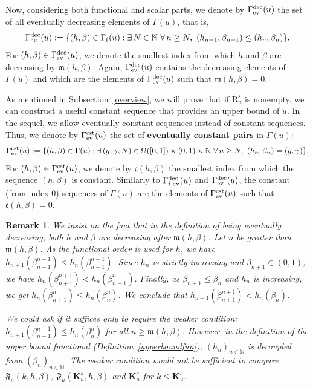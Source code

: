 \documentclass{article}
\def\funset{\Gamma}
\def\fmong{\funset_{{\rm ev}}^{\rm dec}}
\def\fmonfung{{\funset}_{\rm f,{\rm ev}}^{\rm dec}}
\def\fset{\Omega([0,1])}
\def\fcste{\funset_{{\rm ev}}^{\rm cst}}
\def\mon{\mathfrak{m}}
\def\cst{\mathfrak{c}}
\def\secfunh{\funset_{\rm f}}
\def\Fu{\mathfrak{F}_u}
\def\nn{\mathbb N}
\def\bigks{\mathbf{K}^s}
\def\gls#1{{\mathrm R}_{#1}}
\def\gsls#1{\gls{#1}^s}
\newtheorem{remark}{Remark}
\def\blue#1{#1}
\begin{document}
	\blue{Now, considering both functional and scalar parts, we denote by $\fmong(u)$ the set of} all eventually decreasing elements of $\funset(u)$, that is,
	\[
	\fmong(u):=\{(h,\beta)\in\secfunh(u): \exists\, N\in \nn\ \forall\, n\geq N,\ (h_{n+1},\beta_{n+1})\leq (h_n,\beta_n)\}.
	\]
	For $(h,\beta)\in \fmong(u)$, we denote the smallest index from which $h$ and $\beta$ are decreasing by $\mon(h,\beta)$. \blue{Again, $\fmong(u)$ contains the decreasing elements of $\funset(u)$ and which are the elements of $\fmong(u)$ such that $\mon(h,\beta)=0$.}
	
\blue{As mentioned in Subsection~\ref{overview}, we will prove that if $\gsls{u}$ is nonempty, we can construct a useful constant sequence that provides an upper bound of $u$. In the sequel, we allow eventually constant sequences instead of constant sequences. Thus, we denote by $\fcste(u)$ the set of {\bf eventually constant pairs} in $\funset(u)$}:
\[
\fcste(u):=\{(h,\beta)\in \funset(u) : \exists\, (g,\gamma,N)\in\fset\times (0,1) \times\nn\ \forall\, n\geq N,\  (h_n,\beta_n)=(g,\gamma)\}.
\]
For $(h,\beta)\in\fcste(u)$, we denote by $\cst(h,\beta)$ the smallest index from which the sequence $(h,\beta)$ is constant. \blue{Similarly to $\fmonfung(u)$ and $\fmong(u)$, the constant (from index 0) sequences of $\funset(u)$ are the elements of $\fcste(u)$ such that $\cst(h,\beta)=0$.}

	\begin{remark}
		We insist on the fact that in the definition of being eventually decreasing, both $h$ and $\beta$ are decreasing after $\mon(h,\beta)$. Let $n$ be greater than $\mon(h,\beta)$. As the functional order is used for $h$, we have $h_{n+1}(\beta_{n+1}^{n+1})\leq h_n(\beta_{n+1}^{n+1})$. Since $h_n$ is strictly increasing and $\beta_{n+1}\in (0,1)$, we have $h_n(\beta_{n+1}^{n+1})< h_n(\beta_{n+1}^n)$. Finally, as $\beta_{n+1}\leq \beta_n$ and $h_n$ is increasing, we get $h_n(\beta_{n+1}^n)\leq h_n(\beta_n^n)$. We conclude that $h_{n+1}(\beta_{n+1}^{n+1})<h_n(\beta_n)$. 
		
		We could ask if it suffices only to require the weaker condition: $h_{\blue{n+1}}(\beta_{n+1}^{\blue{n+1}})\leq h_n(\beta_n^n)$ for all $n\geq \mon(h,\beta)$. However, in the definition of the upper bound functional (Definition~\ref{upperboundfun}), $(h_n)_{n\in\nn}$ is decoupled from $(\beta_n)_{n\in\nn}$. The weaker condition would not be sufficient to compare $\Fu(k,h,\beta)$, $\Fu(\bigks_u,h,\beta)$ and $\bigks_u$ for $k\leq \bigks_u$. 
	\end{remark}
	
\end{document}

